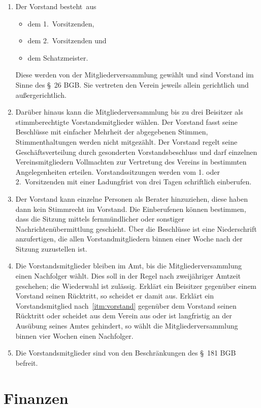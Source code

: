 \documentclass[a4paper, 10pt, headings=normal]{scrartcl}
\begin{document}
\begin{multicols}{2}
\begin{enumerate}[label={(\arabic*)}]
	\item
		\label{itm:vorstand}
		Der Vorstand besteht aus
		\begin{itemize}[label={–}]
			\item
				dem 1.~Vorsitzenden,
			\item
				dem 2.~Vorsitzenden und
			\item
				dem Schatzmeister.
		\end{itemize}
		Diese werden von der Mitgliederversammlung gewählt und sind Vorstand im Sinne des §~26 BGB.
		Sie vertreten den Verein jeweils allein gerichtlich und außergerichtlich.
	\item
		Darüber hinaus kann die Mitgliederversammlung bis zu drei Beisitzer als stimmberechtigte Vorstandsmitglieder wählen.
		Der Vorstand fasst seine Beschlüsse mit einfacher Mehrheit der abgegebenen Stimmen, Stimmenthaltungen werden nicht mitgezählt.
		Der Vorstand regelt seine Geschäftsverteilung durch gesonderten Vorstandsbeschluss und darf einzelnen Vereinsmitgliedern Vollmachten zur Vertretung des Vereins in bestimmten Angelegenheiten erteilen.
		Vorstandssitzungen werden vom 1. oder 2.~Vorsitzenden mit einer Ladungfrist von drei Tagen schriftlich einberufen.
	\item
		Der Vorstand kann einzelne Personen als Berater hinzuziehen, diese haben dann kein Stimmrecht im Vorstand.
		Die Einberufenen können bestimmen, dass die Sitzung mittels fernmündlicher oder sonstiger Nachrichtenübermittlung geschieht.
		Über die Beschlüsse ist eine Niederschrift anzufertigen, die allen Vorstandmitgliedern binnen einer Woche nach der Sitzung zuzustellen ist.
	\item
		Die Vorstandsmitglieder bleiben im Amt, bis die Mitgliederversammlung einen Nachfolger wählt.
		Dies soll in der Regel nach zweijähriger Amtzeit geschehen; die Wiederwahl ist zulässig.
		Erklärt ein Beisitzer gegenüber einem Vorstand seinen Rücktritt, so scheidet er damit aus.
		Erklärt ein Vorstandsmitglied nach~\ref{itm:vorstand} gegenüber dem Vorstand seinen Rücktritt oder scheidet aus dem Verein aus oder ist langfristig an der Ausübung seines Amtes gehindert, so wählt die Mitgliederversammlung binnen vier Wochen einen Nachfolger.
	\item
		Die Vorstandsmitglieder sind von den Beschränkungen des §~181 BGB befreit.
\end{enumerate}

\section{Finanzen}
\label{par:finanzen}


\end{multicols}
\end{document}
